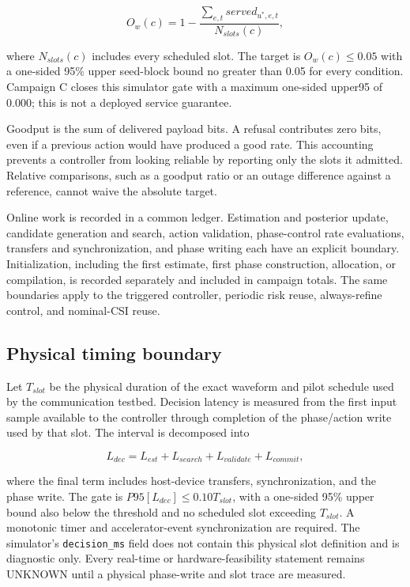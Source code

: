 \documentclass[10pt,twocolumn]{article}
\begin{document}
\[
O_w(c)=1-\frac{\sum_{e,t} served_{u^*,e,t}}{N_{slots}(c)},
\]

where \(N_{slots}(c)\) includes every scheduled slot. The target is
\(O_w(c)\leq 0.05\) with a one-sided 95\% upper seed-block bound no
greater than 0.05 for every condition. Campaign C closes this simulator
gate with a maximum one-sided upper95 of 0.000; this is not a deployed
service guarantee.

Goodput is the sum of delivered payload bits. A refusal contributes zero
bits, even if a previous action would have produced a good rate. This
accounting prevents a controller from looking reliable by reporting only
the slots it admitted. Relative comparisons, such as a goodput ratio or
an outage difference against a reference, cannot waive the absolute
target.

Online work is recorded in a common ledger. Estimation and posterior
update, candidate generation and search, action validation,
phase-control rate evaluations, transfers and synchronization, and phase
writing each have an explicit boundary. Initialization, including the
first estimate, first phase construction, allocation, or compilation, is
recorded separately and included in campaign totals. The same boundaries
apply to the triggered controller, periodic risk reuse, always-refine
control, and nominal-CSI reuse.

\subsection{Physical timing
boundary}\label{physical-timing-boundary}

Let \(T_{slot}\) be the physical duration of the exact waveform and
pilot schedule used by the communication testbed. Decision latency is
measured from the first input sample available to the controller through
completion of the phase/action write used by that slot. The interval is
decomposed into

\[
L_{dec}=L_{est}+L_{search}+L_{validate}+L_{commit},
\]

where the final term includes host-device transfers, synchronization,
and the phase write. The gate is \(P95[L_{dec}]\leq0.10T_{slot}\), with
a one-sided 95\% upper bound also below the threshold and no scheduled
slot exceeding \(T_{slot}\). A monotonic timer and accelerator-event
synchronization are required. The simulator's \texttt{decision\_ms}
field does not contain this physical slot definition and is diagnostic
only. Every real-time or hardware-feasibility statement remains UNKNOWN
until a physical phase-write and slot trace are measured.
\end{document}
